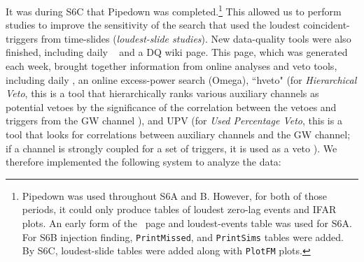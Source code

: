 It was during S6C that Pipedown was completed.\footnote{Pipedown was used
throughout S6A and B. However, for both of those periods, it could only produce
tables of loudest zero-lag events and IFAR plots. An early form of the
\ihope~page and loudest-events table was used for S6A. For S6B injection
finding, \texttt{PrintMissed}, and \texttt{PrintSims} tables were added. By
S6C, loudest-slide tables were added along with \texttt{PlotFM} plots.} This
allowed us to perform studies to improve the sensitivity of the search that
used the loudest coincident-triggers from time-slides (\emph{loudest-slide
studies}). New data-quality tools were also finished, including daily
\ihope~\cite{Pekowsky:thesis} and a DQ wiki page. This page, which was
generated each week, brought together information from online analyses and veto
tools, including daily \ihope, an online excess-power search (Omega), ``hveto"
(for \emph{Hierarchical Veto}, this is a tool that hierarchically ranks various
auxiliary channels as potential vetoes by the significance of the correlation
between the vetoes and triggers from the \ac{GW} channel \cite{Smith:hveto}),
and UPV (for \emph{Used Percentage Veto}, this is a tool that looks for
correlations between auxiliary channels and the \ac{GW} channel; if a channel
is strongly coupled for a set of triggers, it is used as a veto
\cite{Isogai:UPV}). We therefore implemented the following system to analyze
the data:

